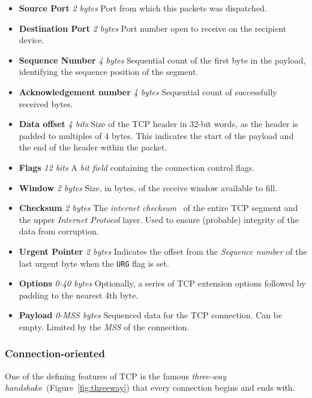         \begin{itemize}
            \item \textbf{Source Port} \textit{2 bytes} Port from which this packets was dispatched.
            \item \textbf{Destination Port} \textit{2 bytes} Port number open to receive on the recipient device.
            \item \textbf{Sequence Number} \textit{4 bytes} Sequential count of the first byte in the payload, identifying the sequence position of the segment.
            \item \textbf{Acknowledgement number} \textit{4 bytes} Sequential count of successfully received bytes.
            \item \textbf{Data offset} \textit{4 bits} Size of the TCP header in 32-bit words, as the header is padded to multiples of 4 bytes. This indicates the start of the payload and the end of the header within the packet.
            \item \textbf{Flags} \textit{12 bits} A \textit{bit field} containing the connection control flags.
            \item \textbf{Window} \textit{2 bytes} Size, in bytes, of the receive window available to fill.
            \item \textbf{Checksum} \textit{2 bytes} The \textit{internet checksum}~\cite{internetchecksum} of the entire TCP segment and the upper \textit{Internet Protocol} layer. Used to ensure (probable) integrity of the data from corruption.
            \item \textbf{Urgent Pointer} \textit{2 bytes} Indicates the offset from the \textit{Sequence number} of the last urgent byte when the \texttt{URG} flag is set.
            \item \textbf{Options} \textit{0-40 bytes} Optionally, a series of TCP extension options followed by padding to the nearest 4th byte.%
            \item \textbf{Payload} \textit{0-MSS bytes} Sequenced data for the TCP connection. Can be empty. Limited by the \textit{MSS} of the connection.
        \end{itemize}

    \subsubsection{Connection-oriented}
        One of the defining features of TCP is the famous \textit{three-way handshake}~(Figure~\ref{fig:threeway}) that every connection begins and ends with.

